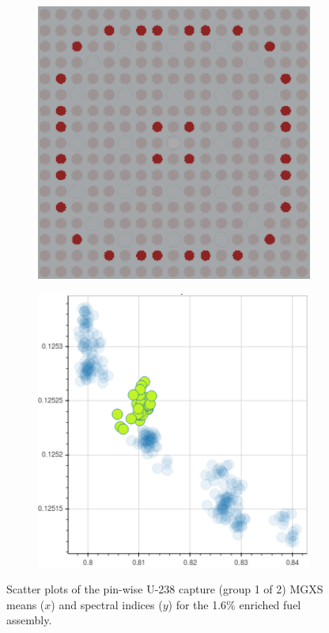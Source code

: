 \begin{figure}[h!]
\begin{subfigure}{0.45\textwidth}
  \caption{}
  \label{fig:chap10-capt-mean-spect-ind-mgxs-2}
\end{subfigure}
\begin{subfigure}{0.45\textwidth}
  \centering
  \includegraphics[width=0.9\linewidth]{figures/unsupervised/features/assm-16/u238-capt/mean-spect-ind/geometry-3}
  \caption{}
  \label{fig:chap10-capt-mean-spect-ind-geom-3}
\end{subfigure}%
\begin{subfigure}{0.45\textwidth}
  \centering
  \includegraphics[width=0.9\linewidth]{figures/unsupervised/features/assm-16/u238-capt/mean-spect-ind/mgxs-3}
  \caption{}
  \label{fig:chap10-capt-mean-spect-ind-mgxs-3}
\end{subfigure}
\caption[Clustering of U-238 capture MGXS spectral indices]{Scatter plots of the pin-wise U-238 capture (group 1 of 2) \ac{MGXS} means ($x$) and spectral indices ($y$) for the 1.6\% enriched fuel assembly.}
\label{fig:chap10-mean-spect-ind}
\end{figure}

